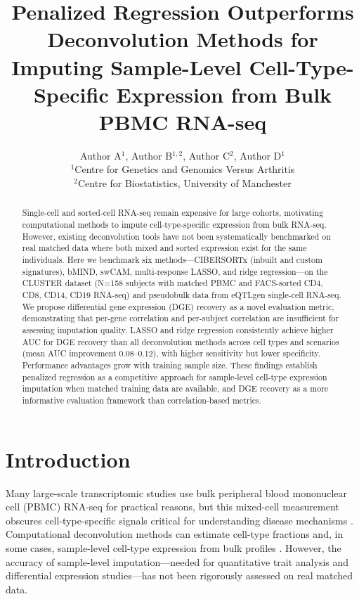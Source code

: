 \documentclass[11pt]{article}
\title{Penalized Regression Outperforms Deconvolution Methods for Imputing Sample-Level Cell-Type-Specific Expression from Bulk PBMC RNA-seq}
\author{Author A$^{1}$, Author B$^{1,2}$, Author C$^{2}$, Author D$^{1}$\\[6pt]
$^{1}$Centre for Genetics and Genomics Versus Arthritis\\
$^{2}$Centre for Biostatistics, University of Manchester}
\date{}
\begin{document}
\maketitle

\begin{abstract}
Single-cell and sorted-cell RNA-seq remain expensive for large cohorts, motivating computational methods to impute cell-type-specific expression from bulk RNA-seq. However, existing deconvolution tools have not been systematically benchmarked on real matched data where both mixed and sorted expression exist for the same individuals. Here we benchmark six methods---CIBERSORTx (inbuilt and custom signatures), bMIND, swCAM, multi-response LASSO, and ridge regression---on the CLUSTER dataset (N=158 subjects with matched PBMC and FACS-sorted CD4, CD8, CD14, CD19 RNA-seq) and pseudobulk data from eQTLgen single-cell RNA-seq. We propose differential gene expression (DGE) recovery as a novel evaluation metric, demonstrating that per-gene correlation and per-subject correlation are insufficient for assessing imputation quality. LASSO and ridge regression consistently achieve higher AUC for DGE recovery than all deconvolution methods across cell types and scenarios (mean AUC improvement 0.08--0.12), with higher sensitivity but lower specificity. Performance advantages grow with training sample size. These findings establish penalized regression as a competitive approach for sample-level cell-type expression imputation when matched training data are available, and DGE recovery as a more informative evaluation framework than correlation-based metrics.
\end{abstract}

\section{Introduction}

Many large-scale transcriptomic studies use bulk peripheral blood mononuclear cell (PBMC) RNA-seq for practical reasons, but this mixed-cell measurement obscures cell-type-specific signals critical for understanding disease mechanisms \citep{avila2018evaluation, sturm2019comprehensive}. Computational deconvolution methods can estimate cell-type fractions and, in some cases, sample-level cell-type expression from bulk profiles \citep{newman2019cibersortx, wang2021bmind, houseman2012dna}. However, the accuracy of sample-level imputation---needed for quantitative trait analysis and differential expression studies---has not been rigorously assessed on real matched data.
\end{document}
